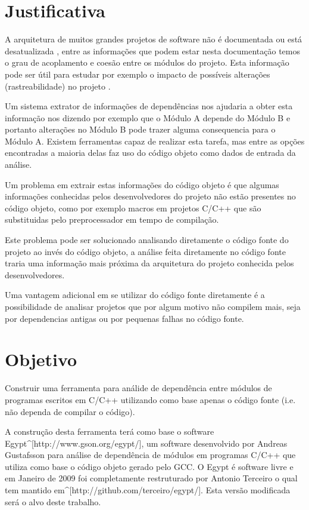 
\chapter{Justificativa}

A arquitetura de muitos grandes projetos de software não é documentada ou está
desatualizada \cite{SourceVersusObjectCodeExtraction}, entre as informações que
podem estar nesta documentação temos o grau de acoplamento e coesão entre os
módulos do projeto. Esta informação pode ser útil para estudar por exemplo o
impacto de possíveis alterações (rastreabilidade) no projeto
\cite{mata26-terceiro-projeto-piloto}.

Um sistema extrator de informações de dependências nos ajudaria a obter esta
informação nos dizendo por exemplo que o Módulo A depende do Módulo B e
portanto alterações no Módulo B pode trazer alguma consequencia para o Módulo
A. Existem ferramentas capaz de realizar esta tarefa, mas entre as opções
encontradas\cite{SourceVersusObjectCodeExtraction} a maioria delas faz uso do
código objeto como dados de entrada da análise.

Um problema em extrair estas informações do código objeto é que algumas
informações conhecidas pelos desenvolvedores do projeto não estão presentes no
código objeto, como por exemplo macros em projetos C/C++ que são substituidas pelo
preprocessador\cite{SourceVersusObjectCodeExtraction} em tempo de compilação.

Este problema pode ser solucionado analisando diretamente o código fonte do
projeto ao invés do código objeto, a análise feita diretamente no código fonte
traria uma informação mais próxima da arquitetura do projeto conhecida pelos
desenvolvedores.

Uma vantagem adicional em se utilizar do código fonte diretamente é a
possibilidade de analisar projetos que por algum motivo não compilem mais, seja
por dependencias antigas ou por pequenas falhas no código fonte.

\chapter{Objetivo}

Construir uma ferramenta para análide de dependência entre módulos de programas
escritos em C/C++ utilizando como base apenas o código fonte (i.e.  não dependa
de compilar o código).

A construção desta ferramenta terá como base o software
Egypt^[http://www.gson.org/egypt/], um software desenvolvido por Andreas
Gustafsson para análise de dependência de módulos em programas C/C++ que
utiliza como base o código objeto gerado pelo GCC. O Egypt é software livre e
em Janeiro de 2009 foi completamente restruturado por Antonio Terceiro o qual
tem mantido em^[http://github.com/terceiro/egypt/]. Esta versão modificada será
o alvo deste trabalho.

